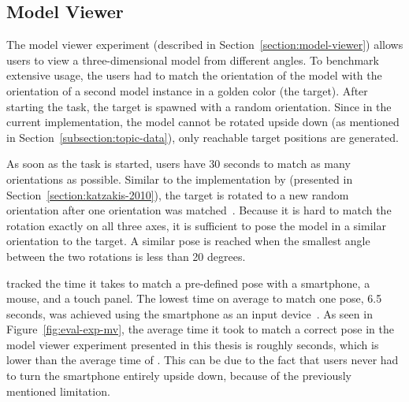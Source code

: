 \subsection{Model Viewer}\label{section:eval-res-mv}

The model viewer experiment (described in Section~\ref{section:model-viewer}) allows users to view a three-dimensional model from different angles. To benchmark extensive usage, the users had to match the orientation of the model with the orientation of a second model instance in a golden color (the target). After starting the task, the target is spawned with a random orientation.
Since in the current implementation, the model cannot be rotated upside down (as mentioned in Section~\ref{subsection:topic-data}), only reachable target positions are generated.

As soon as the task is started, users have 30 seconds to match as many orientations as possible. Similar to the implementation by \citeauthor{Katzakis.2010} (presented in Section~\ref{section:katzakis-2010}), the target is rotated to a new random orientation after one orientation was matched~\cite[140]{Katzakis.2010}.
Because it is hard to match the rotation exactly on all three axes, it is sufficient to pose the model in a similar orientation to the target. A similar pose is reached when the smallest angle between the two rotations is less than 20 degrees.

\citeauthor{Katzakis.2010} tracked the time it takes to match a pre-defined pose with a smartphone, a mouse, and a touch panel. The lowest time on average to match one pose, 6.5 seconds, was achieved using the smartphone as an input device~\cite[140]{Katzakis.2010}. As seen in Figure~\ref{fig:eval-exp-mv}, the average time it took to match a correct pose in the model viewer experiment presented in this thesis is roughly \evalExpMvAvgPoses{} seconds, which is lower than the average time of \citeauthor{Katzakis.2010}. This can be due to the fact that users never had to turn the smartphone entirely upside down, because of the previously mentioned limitation.


